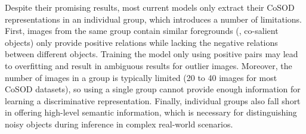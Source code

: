\documentclass[final]{cvpr}
\begin{document}
Despite their promising results, most current models only extract their CoSOD representations in an individual group, which introduces a number of limitations. First, images from the same group  contain  similar foregrounds (\ie, co-salient objects) only provide positive relations while lacking the negative relations between different objects. Training the model  only using positive pairs may lead to overfitting and result in ambiguous results for outlier images. Moreover, the  number of images in a group is typically limited (20 to 40 images for most CoSOD datasets), so using a single group cannot  provide enough information for learning a discriminative representation. Finally, individual groups also fall short in offering high-level semantic information, which is necessary for distinguishing noisy objects during inference in complex real-world scenarios.
\end{document}
